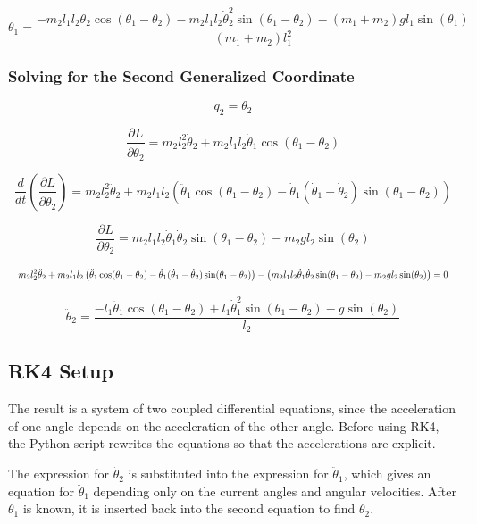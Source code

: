 \documentclass[11pt,a4paper,fleqn]{article}
\begin{document}
\[
    \ddot{\theta}_1 =
    \frac{
    -m_2l_1l_2\ddot{\theta}_2\cos(\theta_1 - \theta_2)
    -m_2l_1l_2\dot{\theta}_2^2\sin(\theta_1 - \theta_2)
    -(m_1 + m_2)g l_1\sin(\theta_1)
    }{(m_1 + m_2)l_1^2}
\]

\subsubsection{Solving for the Second Generalized Coordinate}

\[
    q_2 = \theta_2
\]

\[
    \frac{\partial L}{\partial \dot{\theta}_2}
    = m_2l_2^2\dot{\theta}_2
    + m_2l_1l_2\dot{\theta}_1\cos(\theta_1 - \theta_2)
\]

\[
    \frac{d}{dt}\left(\frac{\partial L}{\partial \dot{\theta}_2}\right)
    = m_2l_2^2\ddot{\theta}_2
    + m_2l_1l_2\left(
    \ddot{\theta}_1\cos(\theta_1 - \theta_2)
    - \dot{\theta}_1(\dot{\theta}_1 - \dot{\theta}_2)
    \sin(\theta_1 - \theta_2)
    \right)
\]

\[
    \frac{\partial L}{\partial \theta_2}
    = m_2l_1l_2\dot{\theta}_1\dot{\theta}_2
    \sin(\theta_1 - \theta_2)
    - m_2g l_2 \sin(\theta_2)
\]

\[
    \resizebox{\textwidth}{!}{$\displaystyle
    m_2l_2^2\ddot{\theta}_2
    + m_2l_1l_2\left(
    \ddot{\theta}_1\cos(\theta_1 - \theta_2)
    - \dot{\theta}_1(\dot{\theta}_1 - \dot{\theta}_2)
    \sin(\theta_1 - \theta_2)
    \right)
    - \left(
    m_2l_1l_2\dot{\theta}_1\dot{\theta}_2
    \sin(\theta_1 - \theta_2)
    - m_2g l_2 \sin(\theta_2)
    \right) = 0$}
\]

\[
    \ddot{\theta}_2 =
    \frac{
    -l_1\ddot{\theta}_1\cos(\theta_1 - \theta_2)
    + l_1\dot{\theta}_1^2\sin(\theta_1 - \theta_2)
    - g\sin(\theta_2)
    }{l_2}
\]

\subsection{RK4 Setup}

The result is a system of two coupled differential equations, since the
acceleration of one angle depends on the acceleration of the other angle. Before
using RK4, the Python script rewrites the equations so that the accelerations
are explicit.

The expression for \(\ddot{\theta}_2\) is substituted into the expression for
\(\ddot{\theta}_1\), which gives an equation for \(\ddot{\theta}_1\) depending
only on the current angles and angular velocities. After \(\ddot{\theta}_1\) is
known, it is inserted back into the second equation to find
\(\ddot{\theta}_2\).
\end{document}
